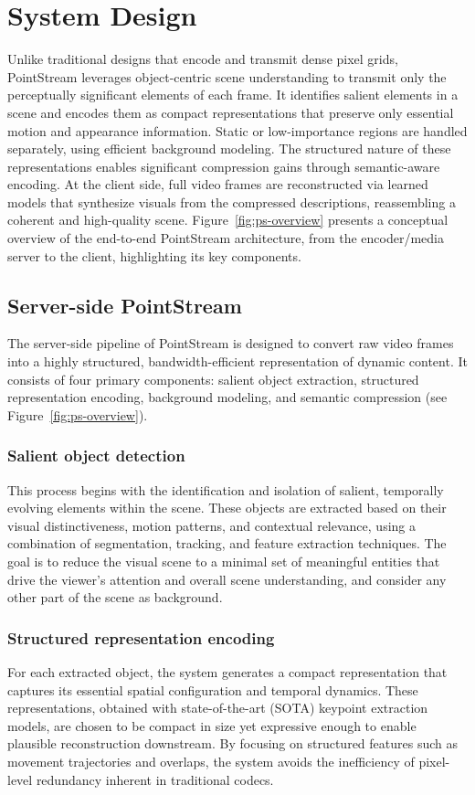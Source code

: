 \documentclass[manuscript, screen]{acmart}
\begin{document}
\section{System Design}

Unlike traditional designs that encode and transmit dense pixel grids, PointStream leverages object-centric scene understanding to transmit only the perceptually significant elements of each frame.
It identifies salient elements in a scene and encodes them as compact representations that preserve only essential motion and appearance information. 
Static or low-importance regions are handled separately, using efficient background modeling. 
The structured nature of these representations enables significant compression gains through semantic-aware encoding. 
At the client side, full video frames are reconstructed via learned models that synthesize visuals from the compressed descriptions, reassembling a coherent and high-quality scene. 
Figure~\ref{fig:ps-overview} presents a conceptual overview of the end-to-end PointStream architecture, from the encoder/media server to the client, highlighting its key components.

\subsection{Server-side PointStream}
The server-side pipeline of PointStream is designed to convert raw video frames into a highly structured, bandwidth-efficient representation of dynamic content. It consists of four primary components: salient object extraction, structured representation encoding, background modeling, and semantic compression (see Figure~\ref{fig:ps-overview}).

\subsubsection*{Salient object detection}
This process begins with the identification and isolation of salient, temporally evolving elements within the scene. 
These objects are extracted based on their visual distinctiveness, motion patterns, and contextual relevance, using a combination of segmentation, tracking, and feature extraction techniques. 
The goal is to reduce the visual scene to a minimal set of meaningful entities that drive the viewer’s attention and overall scene understanding, and consider any other part of the scene as background.

\subsubsection*{Structured representation encoding}
For each extracted object, the system generates a compact representation that captures its essential spatial configuration and temporal dynamics. 
These representations, obtained with state-of-the-art (SOTA) keypoint extraction models, are chosen to be compact in size yet expressive enough to enable plausible reconstruction downstream. 
By focusing on structured features such as movement trajectories and overlaps, the system avoids the inefficiency of pixel-level redundancy inherent in traditional codecs.
\end{document}

